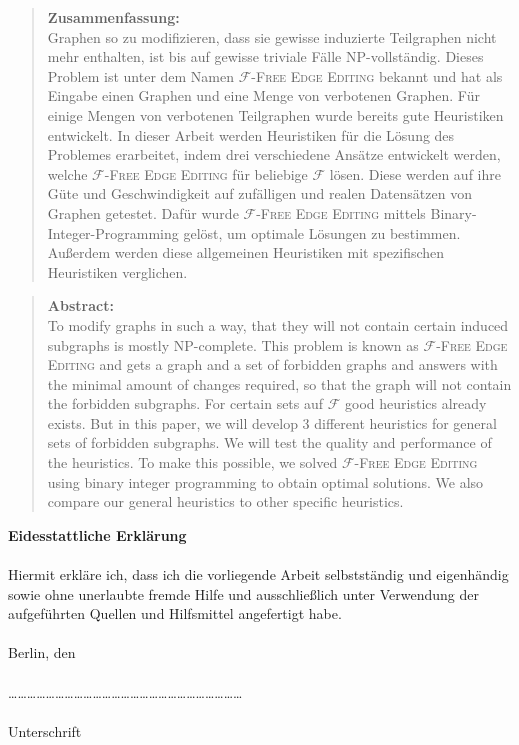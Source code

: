 \documentclass[12pt,a4paper,onecolumn,oneside,titlepage]{article}
\newcommand\cursive[1]{\ensuremath{\mathcal{#1}}}
\begin{document}
\begin{titlepage}
    
     \begin{quote}
        \textbf{Zusammenfassung:}\\ Graphen so zu modifizieren, dass sie gewisse induzierte Teilgraphen nicht mehr enthalten, ist bis auf gewisse triviale Fälle NP-vollständig. Dieses Problem ist unter dem Namen \textsc{\cursive{F}-Free Edge Editing} bekannt und hat als Eingabe einen Graphen und eine Menge von verbotenen Graphen. 
Für einige Mengen von verbotenen Teilgraphen wurde bereits gute Heuristiken entwickelt. In dieser Arbeit werden Heuristiken für die Lösung des Problemes erarbeitet, indem drei verschiedene Ansätze entwickelt werden, welche \textsc{\cursive{F}-Free Edge Editing} für beliebige \cursive{F} lösen. Diese werden auf ihre Güte und Geschwindigkeit auf zufälligen und realen Datensätzen von Graphen getestet. Dafür wurde \textsc{\cursive{F}-Free Edge Editing} mittels Binary-Integer-Programming gelöst, um optimale Lösungen zu bestimmen. Außerdem werden diese allgemeinen Heuristiken mit spezifischen Heuristiken verglichen.
    \end{quote}
    \vspace{2cm}
    \begin{quote}
          \textbf{Abstract:}\\ To modify graphs in such a way, that they will not contain certain induced subgraphs is mostly NP-complete. This problem is known as \textsc{\cursive{F}-Free Edge Editing} and gets a graph and a set of forbidden graphs and answers with the minimal amount of changes required, so that the graph will not contain the forbidden subgraphs.
          For certain sets auf \cursive{F} good heuristics already exists. But in this paper, we will develop 3 different heuristics for general sets of forbidden subgraphs. We will test the quality and performance of the heuristics. To make this possible, we solved \textsc{\cursive{F}-Free Edge Editing}  using binary integer programming to obtain optimal solutions. We also compare our general heuristics to other specific heuristics.
    \end{quote}
    
  \end{titlepage}
\newpage
\textbf{Eidesstattliche Erklärung}\\\\
Hiermit erkläre ich, dass ich die vorliegende Arbeit selbstständig und eigenhändig sowie ohne
unerlaubte fremde Hilfe und ausschließlich unter Verwendung der aufgeführten Quellen und Hilfsmittel
angefertigt habe.\\\\
Berlin, den \\\\
…………………………………………………………………\\\\
Unterschrift\\
\newpage
\tableofcontents
\newpage 
\end{document}
